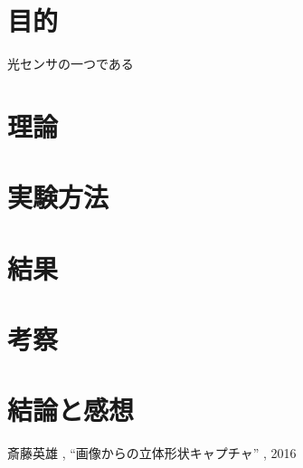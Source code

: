 \documentclass[11pt,a4j]{jsarticle}
\begin{document}


\section{目的}

光センサの一つである

\section{理論}
\label{sec:理論}







\section{実験方法}
\label{sec:実験方法}



\section{結果}
\label{sec:結果}




\section{考察}
\label{sec:考察}

\section{結論と感想}
\label{sec:結論と感想}


\begin{thebibliography}{9} %
 斎藤英雄 , ``画像からの立体形状キャプチャ'' , 2016
\end{thebibliography}
\end{document}
